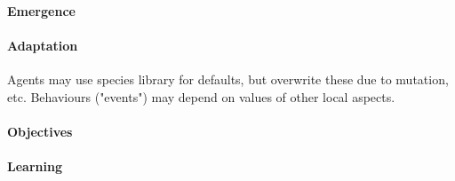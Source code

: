 \documentclass[10pt,letterpaper]{article}
\begin{document}
\paragraph{Emergence}

\paragraph{Adaptation}
Agents may use species library for defaults, but overwrite these due to mutation, etc. Behaviours ("events") may depend on values of other local aspects.

\paragraph{Objectives}

\paragraph{Learning}
\end{document}
